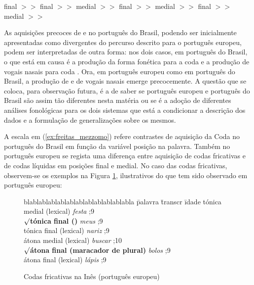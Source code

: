 \documentclass[output=paper]{LSP/langsci}
\begin{document}
\ea\label{ex:freitas_mezzomo}
 final $>>$ \textipa{[n]} final $>>$  medial $>>$  final $>>$  medial $>>$  final $>>$  medial $>>$ 
\z

As aquisições precoces de  e  no português do Brasil, podendo ser inicialmente apresentadas como divergentes do percurso descrito para o português europeu, podem ser interpretadas de outra forma: nos dois casos, em português do Brasil, o que está em causa é a produção da forma fonética \textipa{[w]} para a coda  e a produção de vogais nasais para coda . Ora, em português europeu como em português do Brasil, a produção de \textipa{[w]} e de vogais nasais emerge precocemente. A questão que se coloca, para observação futura, é a de saber se português europeu e português do Brasil são assim tão diferentes nesta matéria ou se é a adoção de diferentes análises fonológicas para os dois sistemas que está a condicionar a descrição dos dados e a formulação de generalizações sobre os mesmos.

A escala em (\ref{ex:freitas_mezzomo}) refere contrastes de aquisição da Coda no português do Brasil em função da variável posição na palavra. Também no português europeu se regista uma diferença entre aquisição de codas fricativas e de codas líquidas em posições final e medial. No caso das codas fricativas, observem-se os exemplos na Figura \ref{fig:freitas_codas_ines}, ilustrativos do que tem sido observado em português europeu:

\begin{figure}
\begin{tabbing}
  blablablablablablablablablablablabla \quad \= palavra \quad \= transcr \quad \= idade \kill
  tónica medial (lexical) \> \textit{festa} \>  ;9 \\
  \textbf{$\surd$tónica final ()} \> \textit{meus} \>  ;9 \\
  tónica final (lexical) \> \textit{nariz} \> \textipa{[5\textprimstress gi5]} ;9 \\
  átona medial (lexical) \> \textit{buscar} \> \textipa{[Bu\textprimstress ka]} ;10 \\
  \textbf{$\surd$átona final (maracador de plural)} \> \textit{bolos} \>  ;9 \\
  átona final (lexical) \> \textit{lápis} \>  ;9 \\
  \end{tabbing}
  \caption{Codas fricativas na Inês (português europeu)}
  \label{fig:freitas_codas_ines}
  \end{figure}
  
\end{document}
